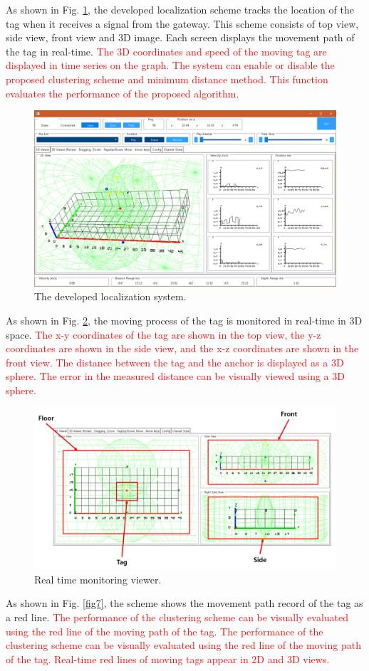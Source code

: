 \documentclass[conference]{IEEEtran}
\begin{document}
As shown in Fig. \ref{fig5}, the developed localization scheme tracks the location of the tag when it receives a signal from the gateway. This scheme consists of top view, side view, front view and 3D image. Each screen displays the movement path of the tag in real-time. \textcolor{red}{The 3D coordinates and speed of the moving tag are displayed in time series on the graph. The system can enable or disable the proposed clustering scheme and minimum distance method. This function evaluates the performance of the proposed algorithm.}

\begin{figure}[htbp]
    \centerline{\includegraphics[width=0.62\columnwidth]{fig5.png}}
    \caption{The developed localization system.}
    \label{fig5}
\end{figure}

As shown in Fig. \ref{fig6}, the moving process of the tag is monitored in real-time in 3D space. \textcolor{red}{The x-y coordinates of the tag are shown in the top view, the y-z coordinates are shown in the side view, and the x-z coordinates are shown in the front view. The distance between the tag and the anchor is displayed as a 3D sphere. The error in the measured distance can be visually viewed using a 3D sphere.}

\begin{figure}[htbp]
    \centerline{\includegraphics[width=0.62\columnwidth]{fig6.png}}
    \caption{Real time monitoring viewer.}
    \label{fig6}
\end{figure}

As shown in Fig. \ref{fig7}, the scheme shows the movement path record of the tag as a red line. \textcolor{red}{The performance of the clustering scheme can be visually evaluated using the red line of the moving path of the tag. The performance of the clustering scheme can be visually evaluated using the red line of the moving path of the tag. Real-time red lines of moving tags appear in 2D and 3D views.}
\end{document}
